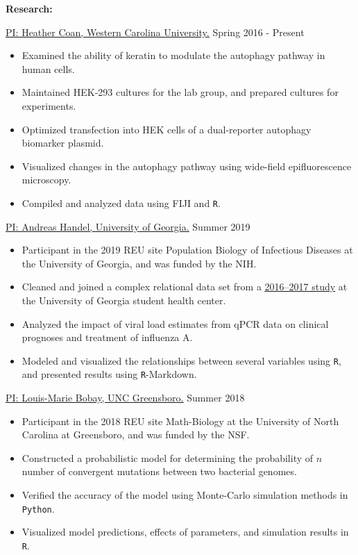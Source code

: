 \textbf{Research:}

\href{https://www.wcu.edu/learn/departments-schools-colleges/cas/science-and-math/biology/biology-faculty-staff/heather-coan.aspx}{\ul{PI: Heather Coan, Western Carolina University.}} \hfill Spring 2016 - Present
\begin{itemize}[noitemsep]
\item Examined the ability of keratin to modulate the autophagy pathway in human cells.
\item Maintained HEK-293 cultures for the lab group, and prepared cultures for experiments.
\item Optimized transfection into HEK cells of a dual-reporter autophagy biomarker plasmid.
\item Visualized changes in the autophagy pathway using wide-field epifluorescence microscopy.
\item Compiled and analyzed data using FIJI and \texttt{R}.
\end{itemize}

\href{https://publichealth.uga.edu/faculty-member/andreas-handel/}{\ul{PI: Andreas Handel, University of Georgia.}} \hfill Summer 2019
\begin{itemize}[noitemsep]
\item Participant in the 2019 REU site Population Biology of Infectious Diseases at the University of Georgia, and was funded by the NIH.
\item Cleaned and joined a complex relational data set from a \href{https://www.jabfm.org/content/32/2/226}{\ul{2016--2017 study}} at the University of Georgia student health center.
\item Analyzed the impact of viral load estimates from qPCR data on clinical prognoses and treatment of influenza A. 
\item Modeled and visualized the relationships between several variables using \texttt{R}, and presented results using \texttt{R}-Markdown.
\end{itemize}

\href{https://biology.uncg.edu/people/louis-marie-bobay-2/}{\ul{PI: Louis-Marie Bobay, UNC Greensboro.}} \hfill Summer 2018
\begin{itemize}[noitemsep]
\item Participant in the 2018 REU site Math-Biology at the University of North Carolina at Greensboro, and was funded by the NSF.
\item Constructed a probabilistic model for determining the probability of $n$ number of convergent mutations between two bacterial genomes.
\item Verified the accuracy of the model using Monte-Carlo simulation methods in \texttt{Python}.
\item Visualized model predictions, effects of parameters, and simulation results in \texttt{R}.
\end{itemize}

